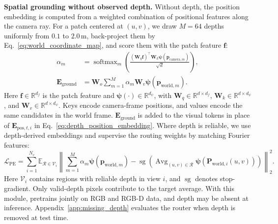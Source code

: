 \noindent\textbf{Spatial grounding without observed depth.}
Without depth, the position embedding is computed from a weighted
combination of positional features along the camera ray.
For a patch centered at $(u,v)$, we draw $M=64$ depths uniformly from
$0.1$ to $2.0\,\mathrm{m}$, back-project them by
Eq.~\ref{eq:world_coordinate_map}, and score them with the patch feature
$\mathbf f$:
\begin{equation}
\begin{aligned}
    \alpha_m
    &=\operatorname{softmax}_{m}
    \left(
        \frac{(\mathbf W_q\mathbf f)^\top
        \mathbf W_k\boldsymbol\psi(\mathbf p_{\mathrm{camera},m})}
        {\sqrt{d}}
    \right),\\
    \mathbf E_{\mathrm{ground}}
    &=\mathbf W_o\sum_{m=1}^{M}
        \alpha_m\mathbf W_v
        \boldsymbol\psi(\mathbf p_{\mathrm{world},m}).
\end{aligned}
\label{eq:frustum_routing}
\end{equation}
Here $\mathbf f\in\mathbb R^{d_f}$ is the patch feature and
$\boldsymbol\psi(\cdot)\in\mathbb R^{d_\psi}$, with
$\mathbf W_q\in\mathbb R^{d\times d_f}$,
$\mathbf W_k\in\mathbb R^{d\times d_\psi}$, and
$\mathbf W_v\in\mathbb R^{d\times d_\psi}$.
Keys encode camera-frame positions, and values encode the same candidates
in the world frame.
$\mathbf E_{\mathrm{ground}}$ is added to the visual tokens in place of
$\mathbf E_{\mathrm{pos},t,i}$ in Eq.~\ref{eq:depth_position_embedding}.
Where depth is reliable, we use depth-derived embeddings and supervise
the routing weights by matching Fourier features:
\begin{equation}
    \mathcal L_{\mathrm{PE}}
    =\sum_{i=1}^{N_v}
    \mathbb E_{\mathcal R\in\mathcal V_i}
    \left\|
        \sum_{m=1}^{M}\alpha_m
        \boldsymbol\psi(\mathbf p_{\mathrm{world},m})
        -\operatorname{sg}\!\left(
            \operatorname{Avg}_{(u,v)\in\mathcal R}
            \boldsymbol\psi(\mathbf P_{\mathrm{world},i}(u,v))
        \right)
    \right\|_2^2 .
    \label{eq:position_distillation}
\end{equation}
Here $\mathcal V_i$ contains regions with reliable depth in view $i$,
and $\operatorname{sg}$ denotes stop-gradient. Only valid-depth pixels
contribute to the target average.
With this module, \method{} pretrains jointly on RGB and RGB-D data, and depth may be absent at inference.
Appendix~\ref{app:missing_depth} evaluates the router when depth is
removed at test time.

\vspace{-0.2cm}
